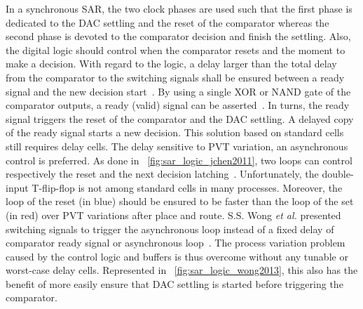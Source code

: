 In a synchronous SAR, the two clock phases are used such that the first phase is dedicated to the DAC settling and the reset of the comparator whereas the second phase is devoted to the comparator decision and finish the settling. Also, the digital logic should control when the comparator resets and the moment to make a decision. With regard to the logic, a delay larger than the total delay from the comparator to the switching signals shall be ensured between a ready signal and the new decision start~\cite{Brenna2014}. By using a single XOR or NAND gate of the comparator outputs, a ready (valid) signal can be asserted~\cite{Brenna2014, Sekimoto2011, Zhu2015,Shen2018}. In turns, the ready signal triggers the reset of the comparator and the DAC settling. A delayed copy of the ready signal starts a new decision. This solution based on standard cells still requires delay cells. The delay sensitive to PVT variation, an asynchronous control is preferred. As done in \figurename~\ref{fig:sar_logic_jchen2011}, two loops can control respectively the reset and the next decision latching~\cite{JChen2011}. Unfortunately, the double-input T-flip-flop is not among standard cells in many processes. Moreover, the loop of the reset (in blue) should be ensured to be faster than the loop of the set (in red) over PVT variations after place and route. S.S. Wong \textit{et al.} presented switching signals to trigger the asynchronous loop instead of a fixed delay of comparator ready signal or asynchronous loop~\cite{Wong2013}. The process variation problem caused by the control logic and buffers is thus overcome without any tunable or worst-case delay cells. Represented in \figurename~\ref{fig:sar_logic_wong2013}, this also has the benefit of more easily ensure that DAC settling is started before triggering the comparator.


